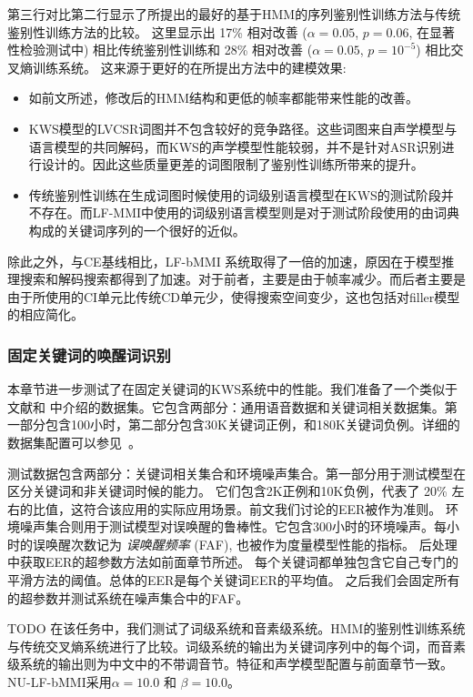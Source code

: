 第三行对比第二行显示了所提出的最好的基于HMM的序列鉴别性训练方法与传统鉴别性训练方法的比较。
这里显示出 17\% 相对改善 ($\alpha = 0.05$, $p = 0.06$, 在显著性检验测试中) 相比传统鉴别性训练和 28\% 相对改善 ($\alpha = 0.05$, $p = 10^{-5}$)  相比交叉熵训练系统。
这来源于更好的在所提出方法中的建模效果:
\begin{itemize}
 \item 如前文所述，修改后的HMM结构和更低的帧率都能带来性能的改善。
 \item KWS模型的LVCSR词图并不包含较好的竞争路径。这些词图来自声学模型与语言模型的共同解码，而KWS的声学模型性能较弱，并不是针对ASR识别进行设计的。因此这些质量更差的词图限制了鉴别性训练所带来的提升。
 \item 传统鉴别性训练在生成词图时候使用的词级别语言模型在KWS的测试阶段并不存在。而LF-MMI中使用的词级别语言模型则是对于测试阶段使用的由词典构成的关键词序列的一个很好的近似。
\end{itemize}
除此之外，与CE基线相比，LF-bMMI 系统取得了一倍的加速，原因在于模型推理搜索和解码搜索都得到了加速。对于前者，主要是由于帧率减少。而后者主要是由于所使用的CI单元比传统CD单元少，使得搜索空间变少，这也包括对filler模型的相应简化。


\subsubsection{固定关键词的唤醒词识别}
\label{Sec:exp-wakeup-word-rec}

本章节进一步测试了在固定关键词的KWS系统中的性能。我们准备了一个类似于文献\cite{chen2014small}和  \cite{cas-icassp17}中介绍的数据集。它包含两部分：通用语音数据和关键词相关数据集。第一部分包含100小时，第二部分包含30K关键词正例，和180K关键词负例。详细的数据集配置可以参见~\cite{chen2018kws}。

测试数据包含两部分：关键词相关集合和环境噪声集合。第一部分用于测试模型在区分关键词和非关键词时候的能力\cite{chen2014small}。 它们包含2K正例和10K负例，代表了 20\% 左右的比值，这符合该应用的实际应用场景。前文我们讨论的EER被作为准则。
环境噪声集合则用于测试模型对误唤醒的鲁棒性\cite{cas-icassp17}。它包含300小时的环境噪声。每小时的误唤醒次数记为 {\em{误唤醒频率}} (FAF), 也被作为度量模型性能的指标。
后处理中获取EER的超参数方法如前面章节所述。
每个关键词都单独包含它自己专门的平滑方法的阈值。总体的EER是每个关键词EER的平均值。
之后我们会固定所有的超参数并测试系统在噪声集合中的FAF。

TODO
在该任务中，我们测试了词级系统和音素级系统。HMM的鉴别性训练系统与传统交叉熵系统进行了比较。词级系统的输出为关键词序列中的每个词，而音素级系统的输出则为中文中的不带调音节。特征和声学模型配置与前面章节一致。
NU-LF-bMMI采用$\alpha=10.0$ 和 $\beta=10.0$。

